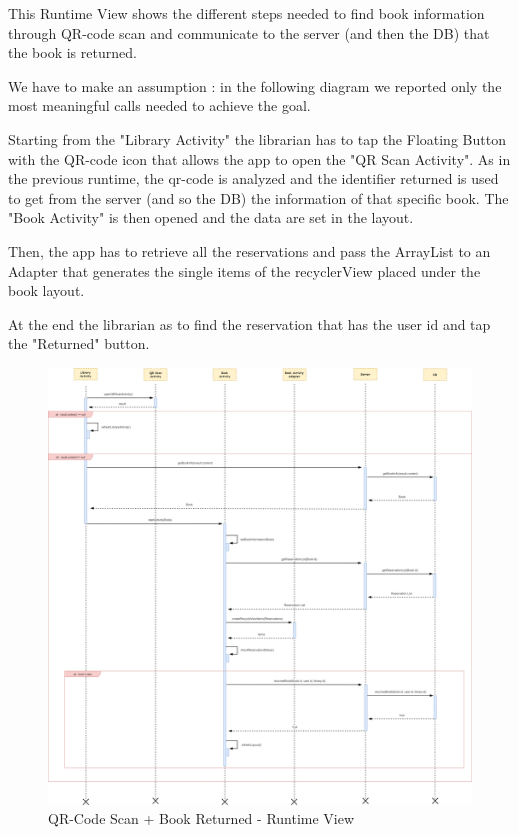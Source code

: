 \newpage
\vspace*{0cm}
\vspace*{0.5cm}

This Runtime View shows the different steps needed to find book information through QR-code scan and communicate to the server (and then the DB) that the book is returned.\par
We have to make an assumption : in the following diagram we reported only the most meaningful calls needed to achieve the goal.\par
Starting from the "Library Activity" the librarian has to tap the Floating Button with the QR-code icon that allows the app to open the "QR Scan Activity". As in the previous runtime, the qr-code is analyzed and the identifier returned is used to get from the server (and so the DB) the information of that specific book. The "Book Activity" is then opened and the data are set in the layout.\par
Then, the app has to retrieve all the reservations and pass the ArrayList to an Adapter that generates the single items of the recyclerView placed under the book layout.\par
At the end the librarian as to find the reservation that has the user id and tap the "Returned" button.
\newpage
\vspace*{0cm}
\begin{figure}[H]
	\centering
	\includegraphics[scale=0.21]{Images/Runtime/librarian_qrcode_returned}
	\caption{QR-Code Scan + Book Returned - Runtime View}
\end{figure}